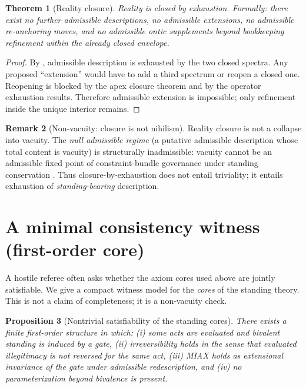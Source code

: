 \documentclass[11pt]{article}
\newtheorem{theorem}{Theorem}[section]
\newtheorem{proposition}[theorem]{Proposition}
\theoremstyle{definition}
\newtheorem{remark}[theorem]{Remark}
\begin{document}
\begin{theorem}[Reality closure]
\label{thm:reality-closed}
Reality is closed by exhaustion.
Formally: there exist no further admissible descriptions, no admissible extensions, no admissible re-anchoring moves, and no admissible ontic supplements beyond bookkeeping refinement within the already closed envelope.
\end{theorem}

\begin{proof}
By , admissible description is exhausted by the two closed spectra.
Any proposed ``extension'' would have to add a third spectrum or reopen a closed one.
Reopening is blocked by the apex closure theorem  and by the operator exhaustion results.
Therefore admissible extension is impossible; only refinement inside the unique interior remains.
\end{proof}

\begin{remark}[Non-vacuity: closure is not nihilism]
Reality closure is not a collapse into vacuity.
The \emph{null admissible regime} (a putative admissible description whose total content is vacuity) is structurally inadmissible:
vacuity cannot be an admissible fixed point of constraint-bundle governance under standing conservation \cite{MaleyNonCollapseReality2026}.
Thus closure-by-exhaustion does not entail triviality; it entails exhaustion of \emph{standing-bearing} description.
\end{remark}


\section{A minimal consistency witness (first-order core)}
\label{sec:consistency}

A hostile referee often asks whether the axiom cores used above are jointly satisfiable.
We give a compact witness model for the \emph{cores} of the standing theory.
This is not a claim of completeness; it is a non-vacuity check.

\begin{proposition}[Nontrivial satisfiability of the standing cores]
\label{prop:consistency}
There exists a finite first-order structure in which:
(i) some acts are evaluated and bivalent standing is induced by a gate,
(ii) irreversibility holds in the sense that evaluated illegitimacy is not reversed for the same act,
(iii) MIAX holds as extensional invariance of the gate under admissible redescription,
and (iv) no parameterization beyond bivalence is present.
\end{proposition}
\end{document}

